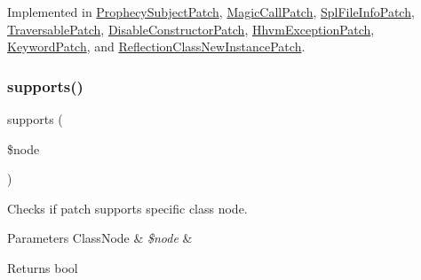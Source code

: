 Implemented in \mbox{\hyperlink{class_prophecy_1_1_doubler_1_1_class_patch_1_1_prophecy_subject_patch_a1e7a3c168dcd0901a0d2669c67575b55}{Prophecy\+Subject\+Patch}}, \mbox{\hyperlink{class_prophecy_1_1_doubler_1_1_class_patch_1_1_magic_call_patch_a1e7a3c168dcd0901a0d2669c67575b55}{Magic\+Call\+Patch}}, \mbox{\hyperlink{class_prophecy_1_1_doubler_1_1_class_patch_1_1_spl_file_info_patch_a1e7a3c168dcd0901a0d2669c67575b55}{Spl\+File\+Info\+Patch}}, \mbox{\hyperlink{class_prophecy_1_1_doubler_1_1_class_patch_1_1_traversable_patch_a1e7a3c168dcd0901a0d2669c67575b55}{Traversable\+Patch}}, \mbox{\hyperlink{class_prophecy_1_1_doubler_1_1_class_patch_1_1_disable_constructor_patch_a1e7a3c168dcd0901a0d2669c67575b55}{Disable\+Constructor\+Patch}}, \mbox{\hyperlink{class_prophecy_1_1_doubler_1_1_class_patch_1_1_hhvm_exception_patch_a1e7a3c168dcd0901a0d2669c67575b55}{Hhvm\+Exception\+Patch}}, \mbox{\hyperlink{class_prophecy_1_1_doubler_1_1_class_patch_1_1_keyword_patch_a1e7a3c168dcd0901a0d2669c67575b55}{Keyword\+Patch}}, and \mbox{\hyperlink{class_prophecy_1_1_doubler_1_1_class_patch_1_1_reflection_class_new_instance_patch_a1e7a3c168dcd0901a0d2669c67575b55}{Reflection\+Class\+New\+Instance\+Patch}}.

\mbox{\label{interface_prophecy_1_1_doubler_1_1_class_patch_1_1_class_patch_interface_a99b2455ac194faf79aff042c55719ac2}} 
\subsubsection{\texorpdfstring{supports()}{supports()}}
{\footnotesize\ttfamily supports (\begin{DoxyParamCaption}\item[{\mbox{\hyperlink{class_prophecy_1_1_doubler_1_1_generator_1_1_node_1_1_class_node}{Class\+Node}}}]{\$node }\end{DoxyParamCaption})}

Checks if patch supports specific class node.


\begin{DoxyParams}[1]{Parameters}
Class\+Node & {\em \$node} & \\
\hline
\end{DoxyParams}
\begin{DoxyReturn}{Returns}
bool 
\end{DoxyReturn}


